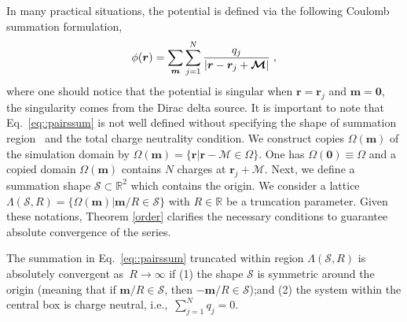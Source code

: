 In many practical situations, the potential is defined via the following Coulomb summation formulation,
\begin{equation}\label{eq::pairssum}
	\phi(\bm{r})=\sum_{\boldsymbol{m}}\sum_{j=1}^{N}\frac{q_{j}}{|\bm{r}-\bm{r}_{j} + \bm{\mathcal{M}}|}\;,
\end{equation}
where one should notice that the potential is singular when $\bm{r}=\bm{r}_{j}$ and $\bm{m}=\bm{0}$, the singularity comes from the Dirac delta source. 
It is important to note that Eq.~\eqref{eq::pairssum} is not well defined without specifying the shape of summation region~\cite{de1980simulation,smith2008electrostatic} and the total charge neutrality condition. 
We construct copies $\Omega(\bm{m})$ of the simulation domain by $\Omega(\bm{m})=\{\bm{r}|\bm{r}-\bm{\mathcal{M}}\in\Omega\}$. One has $\Omega(\bm{0})\equiv\Omega$ and a copied domain $\Omega(\bm{m})$ contains $N$ charges at $\bm{r}_j+\bm{\mathcal{M}}$. 
Next, we define a summation shape $\mathcal{S} \subset \mathbb{R}^2$ which contains the origin.
We consider a lattice $\Lambda(\mathcal{S},R)=\{\Omega(\bm{m})|\bm{m}/R\in\mathcal{S}\}$ with $R\in\mathbb{R}$ be a truncation parameter. 
Given these notations, Theorem \ref{order} clarifies the necessary conditions to guarantee absolute convergence of the series.

\begin{thm} \label{order}
    The summation in Eq.~\eqref{eq::pairssum} truncated within region $\Lambda(\mathcal{S},R)$ is absolutely convergent as~$R \to \infty$ if (1) the shape $\mathcal{S}$ is symmetric around the origin (meaning that if $\bm{m} / R \in \mathcal{S}$, then $- \bm{m}/ R \in \mathcal{S}$);and (2) the system within the central box is charge neutral, i.e.,~$\sum_{j = 1}^N q_j = 0$.
\end{thm}

